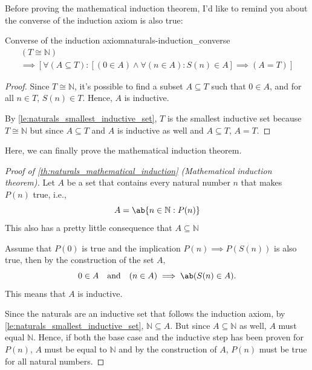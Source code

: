 Before proving the mathematical induction theorem, I'd like to remind you about the converse of the
induction axiom is also true:
\begin{cor}{Converse of the induction axiom}{naturals-induction_converse}
  \begin{multline*}
    (T \cong \mathbb{N})                                                                                    \\
    \implies [\forall (A \subseteq T) : [(0 \in A) \land \forall (n \in A) : S(n) \in A] \implies (A = T) ]
  \end{multline*}
\end{cor}
\begin{proof}
  Since \(T \cong \mathbb{N}\), it's possible to find a subset \(A \subseteq T\) such that
  \(0 \in A\), and for all \(n \in T\), \(S(n) \in T\). Hence, \(A\) is inductive.

  By \cref{le:naturals_smallest_inductive_set}, \(T\) is the smallest inductive set because
  \(T \cong \mathbb{N}\) but since \(A \subseteq T\) and \(A\) is inductive as well and
  \(A \subseteq T\), \(A = T\).
\end{proof}

Here, we can finally prove the mathematical induction theorem.

\begin{proof}[Proof of \cref{th:naturals_mathematical_induction} (Mathematical induction theorem)]
  Let \(A\) be a set that contains every natural number \(n\) that makes \(P(n)\) true, i.e.,
  \begin{equation}
    A = \ab\{n \in \mathbb{N} : P(n)\}
  \end{equation}
  This also has a pretty little consequence that \(A \subseteq \mathbb{N}\)

  Assume that \(P(0)\) is true and the implication \(P(n) \implies P(S(n))\) is also true, then by
  the construction of the set \(A\),
  \begin{equation}
    0 \in A \mathand (n \in A) \implies \ab(S(n) \in A).
  \end{equation}
  This means that \(A\) is inductive.

  Since the naturals are an inductive set that follows the induction axiom, by
  \cref{le:naturals_smallest_inductive_set}, \(\mathbb{N} \subseteq A\). But since
  \(A \subseteq \mathbb{N}\) as well, \(A\) must equal \(\mathbb{N}\). Hence, if both the base case
  and the inductive step has been proven for \(P(n)\), \(A\) must be equal to \(\mathbb{N}\) and by
  the construction of \(A\), \(P(n)\) must be true for all natural numbers.
\end{proof}

